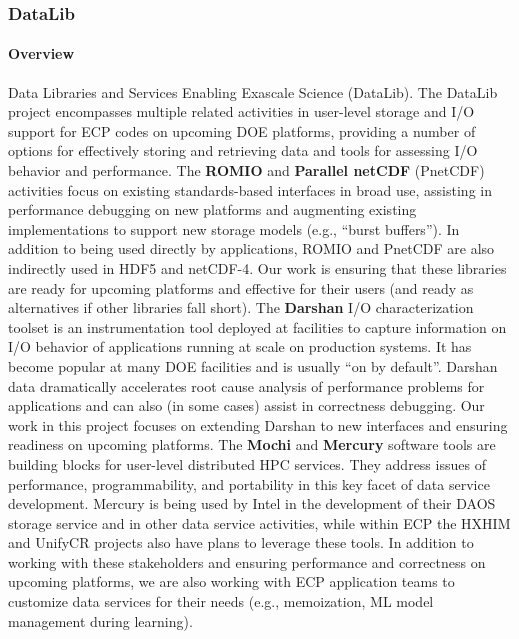 \subsubsection{DataLib} 

\paragraph{Overview} 

Data Libraries and Services Enabling Exascale Science (DataLib). The
DataLib project encompasses multiple related activities in user-level
storage and I/O support for ECP codes on upcoming DOE platforms,
providing a number of options for effectively storing and retrieving
data and tools for assessing I/O behavior and performance.
%
The \textbf{ROMIO} and \textbf{Parallel netCDF} (PnetCDF) activities
focus on existing standards-based interfaces in broad use, assisting
in performance debugging on new platforms and augmenting existing
implementations to support new storage models (e.g., “burst
buffers”). In addition to being used directly by applications, ROMIO
and PnetCDF are also indirectly used in HDF5 and netCDF-4. Our work is
ensuring that these libraries are ready for upcoming platforms and
effective for their users (and ready as alternatives if other
libraries fall short).
%
The \textbf{Darshan} I/O characterization toolset is an instrumentation tool
deployed at facilities to capture information on I/O behavior of
applications running at scale on production systems. It has become
popular at many DOE facilities and is usually “on by default”. Darshan
data dramatically accelerates root cause analysis of performance
problems for applications and can also (in some cases) assist in
correctness debugging. Our work in this project focuses on extending
Darshan to new interfaces and ensuring readiness on upcoming
platforms.
%
The \textbf{Mochi} and \textbf{Mercury} software tools are building blocks for
user-level distributed HPC services. They address issues of
performance, programmability, and portability in this key facet of
data service development. Mercury is being used by Intel in the
development of their DAOS storage service and in other data service
activities, while within ECP the HXHIM and UnifyCR projects also have
plans to leverage these tools. In addition to working with these
stakeholders and ensuring performance and correctness on upcoming
platforms, we are also working with ECP application teams to customize
data services for their needs (e.g., memoization, ML model management
during learning).

